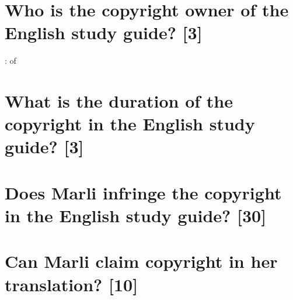 \documentclass[11pt]{article}
\begin{document}
\cite{burger85_bosal_afrika_v_grapnel}
\section{Who is the copyright owner of the English study guide? \textbf{[3]}}
\label{sec:org052b9ae}
\cite{rsa78_copyrightact}:  of 
\section{What is the duration of the copyright in the English study guide? \textbf{[3]}}
\label{sec:org2c41f87}
\cite{wto17_trips}
\section{Does Marli infringe the copyright in the English study guide? \textbf{[30]}}
\label{sec:org59d43ea}
\section{Can Marli claim copyright in her translation? \textbf{[10]}}
\label{sec:orgcb7b8c2}
\printbibliography
\end{document}
